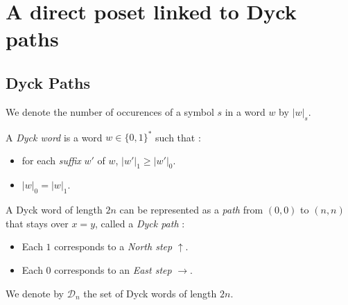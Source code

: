\section{A direct poset linked to Dyck paths}

\subsection{Dyck Paths}

\begin{notation}
    We denote the number of occurences of a symbol $s$ in
    a word $w$ by $|w|_s$.
\end{notation}

\begin{definition}
    A \emph{Dyck word} is a word $w \in \{0,1\}^*$ such
    that :
    \begin{itemize}
        \item for each \emph{suffix} $w'$ of $w$,
            $|w'|_1 \geqslant |w'|_0$.
        \item $|w|_0 = |w|_1$.
    \end{itemize}
    A Dyck word of length $2n$ can be represented as a 
    \emph{path} from $(0,0)$ to $(n,n)$ that stays over
    $x = y$, called a \emph{Dyck path} :
    \begin{itemize}
        \item Each $1$ corresponds to a \emph{North step}
        $\uparrow$. 
        \item Each $0$ corresponds to an \emph{East step}
        $\rightarrow$.
    \end{itemize}
    We denote by $\mathcal{D}_n$ the set of Dyck words of
    length $2n$.
\end{definition}

